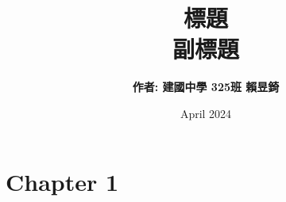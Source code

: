 \documentclass[12pt]{article}
\title{\textbf{標題}\\ \vspace{0.5cm}副標題}
\author{\textbf{作者: 建國中學 325班 賴昱錡}}
\date{April 2024}
\begin{document}
\doublespacing
\maketitle

\newpage
\tableofcontents
\newpage

\section{Chapter 1}
\end{document}

